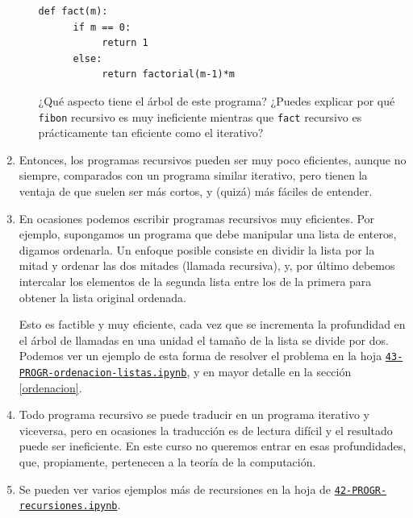 \begin{enumerate}
\begin{enumerate}
{}\parindent\begin{minipage}{.85\textwidth}\rm\small
\begin{lstlisting}[columns=spaceflexible]
def fact(m):
      if m == 0:
           return 1
      else:
           return factorial(m-1)*m

\end{lstlisting}
\end{minipage}

¿Qué aspecto tiene el árbol de este programa? ¿Puedes explicar por qué
{\tt fibon} recursivo es muy ineficiente mientras que  {\tt fact} recursivo es
prácticamente tan eficiente como el iterativo?

\end{enumerate}

\item Entonces, los programas recursivos pueden  ser muy poco eficientes, aunque
no siempre, 
comparados con un programa similar iterativo,  pero
tienen la ventaja de que suelen ser más cortos, y (quizá) más fáciles de
entender. 


\item  En ocasiones podemos escribir programas recursivos muy eficientes. Por
ejemplo, supongamos un programa que debe manipular una lista de enteros, digamos
ordenarla. Un enfoque posible consiste en dividir la lista por la mitad y
ordenar las dos mitades (llamada recursiva), y, por último debemos  
intercalar los elementos de la segunda lista entre los de la primera para
obtener la lista original ordenada. 

Esto es factible y muy eficiente, cada vez que se incrementa la profundidad en
el árbol de llamadas en una unidad el tamaño de la lista se divide por dos. 
Podemos ver  un ejemplo de esta forma de resolver el problema en la hoja
\href{http://localhost:8888/notebooks/PROGR/43-PROGR-ordenacion-listas.ipynb}{\tt 43-PROGR-ordenacion-listas.ipynb}, y en mayor detalle en la secci\'on \ref{ordenacion}.

\item Todo programa recursivo se puede traducir en un programa iterativo y
viceversa, pero en ocasiones la traducci\'on es de lectura difícil  y el
resultado puede ser ineficiente.  En este curso no queremos entrar en esas
profundidades, que,  propiamente,  pertenecen a  la teoría de la computación.


\item Se pueden ver varios ejemplos m\'as de recursiones en la hoja de {\sage} \href{http://localhost:8888/notebooks/PROGR/42-PROGR-recursiones.ipynb}{\tt 42-PROGR-recursiones.ipynb}.



\end{enumerate}



